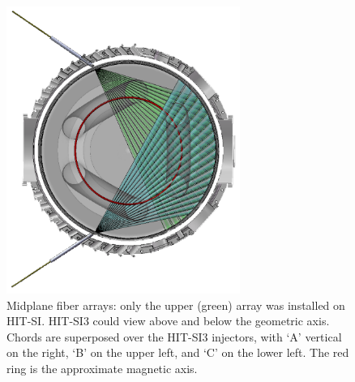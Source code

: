 \begin{center}
\begin{figure}
\includegraphics[width=3.0in]{Mohawk_IDS_dual.png}
\caption{Midplane fiber arrays: only the upper (green) array was installed on HIT-SI. HIT-SI3 could view above and below the geometric axis. Chords are superposed over the HIT-SI3 injectors, with `A' vertical on the right, `B' on the upper left, and `C' on the lower left. The red ring is the approximate magnetic axis.}\label{Fibers Midplane}
\end{figure}
\end{center}

